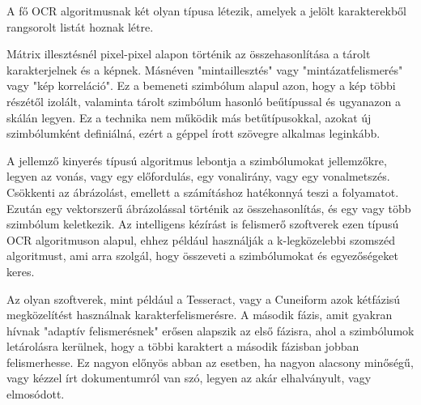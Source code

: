 \cite{bradski2000opencv}
A fő OCR algoritmusnak két olyan típusa létezik, amelyek a jelölt karakterekből rangsorolt listát hoznak létre.

Mátrix illesztésnél pixel-pixel alapon történik az összehasonlítása a tárolt karakterjelnek és a képnek. Másnéven "mintaillesztés" vagy "mintázatfelismerés" vagy "kép korreláció". Ez a bemeneti szimbólum alapul azon, hogy a kép többi részétől izolált, valaminta tárolt szimbólum hasonló beűtípussal és ugyanazon a skálán legyen. Ez a technika nem működik más betűtípusokkal, azokat új szimbólumként definiálná, ezért a géppel írott szövegre alkalmas leginkább.

A jellemző kinyerés típusú algoritmus lebontja a szimbólumokat jellemzőkre, legyen az vonás, vagy egy előfordulás, egy vonalirány, vagy egy vonalmetszés. Csökkenti az ábrázolást, emellett a számításhoz hatékonnyá teszi a folyamatot. Ezután egy vektorszerű ábrázolással történik az összehasonlítás, és egy vagy több szimbólum keletkezik. Az intelligens kézírást is felismerő szoftverek ezen típusú OCR algoritmuson alapul, ehhez például használják a k-legközelebbi szomszéd algoritmust, ami arra szolgál, hogy összeveti a szimbólumokat és egyezőségeket keres.

Az olyan szoftverek, mint például a Tesseract, vagy a Cuneiform azok kétfázisú megközelítést használnak karakterfelismerésre. A második fázis, amit gyakran hívnak "adaptív felismerésnek" erősen alapszik az első fázisra, ahol a szimbólumok letárolásra kerülnek, hogy a többi karaktert a második fázisban jobban felismerhesse. Ez nagyon előnyös abban az esetben, ha nagyon alacsony minőségű, vagy kézzel írt dokumentumról van szó, legyen az akár elhalványult, vagy elmosódott.
